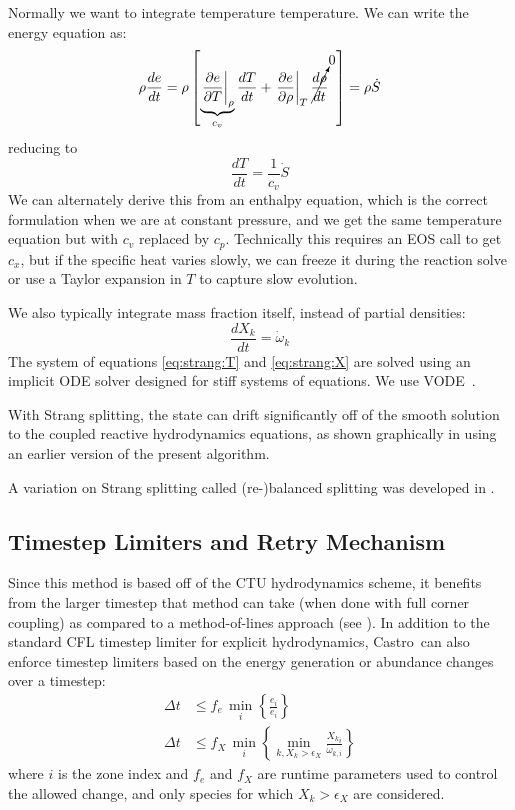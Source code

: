 \documentclass[times,modern]{aastex63}
\newcommand{\castro}{{\sf Castro}}
\newcommand{\omegadot}{\dot{\omega}}
\newcommand{\Sdot}{\dot{S}}
\newcommand{\odt}[1]{{\frac{{d#1}}{dt}}}
\begin{document}
Normally we want to integrate temperature temperature.  We can write the
energy equation as:
\begin{equation}
\rho \odt{e} = \rho \left [ \underbrace{\left . \frac{\partial e}{\partial T} \right |_\rho}_{c_v}
                            \odt{T} +
                            \left . \frac{\partial e}{\partial \rho} \right |_T
                            \cancelto{0}{\odt{\rho}} \;\; \right ] = \rho \Sdot
\end{equation}
reducing to
\begin{equation}
\label{eq:strang:T}
\odt{T} = \frac{1}{c_v} \Sdot
\end{equation}
We can alternately derive this from an enthalpy equation, which is the
correct formulation when we are at constant pressure, and we get the
same temperature equation but with $c_v$ replaced by $c_p$.
Technically this requires an EOS call to get $c_x$, but if the
specific heat varies slowly, we can freeze it during the reaction
solve or use a Taylor expansion in $T$ to capture slow evolution.

We also typically integrate mass fraction itself, instead of partial
densities:
\begin{equation}
\label{eq:strang:X}
\odt{X_k} = \omegadot_k
\end{equation}
The system of equations \ref{eq:strang:T} and \ref{eq:strang:X} are
solved using an implicit ODE solver designed for stiff systems of
equations.  We use VODE~\citep{vode}.

With Strang splitting, the state can drift significantly off of the
smooth solution to the coupled reactive hydrodynamics equations, as
shown graphically in \cite{astronum:2018} using an earlier version of
the present algorithm.

A variation on Strang splitting called (re-)balanced splitting was
developed in \citet{speth:2013}.


\subsection{Timestep Limiters and Retry Mechanism}

Since this method is based off of the CTU hydrodynamics scheme, it
benefits from the larger timestep that method can take (when done with
full corner coupling) as compared to a method-of-lines approach (see
\citealt{ppmunsplit}).  In addition to the standard CFL timestep
limiter for explicit hydrodynamics, \castro\ can also enforce
timestep limiters based on the energy generation or abundance changes
over a timestep:
\begin{align}
\label{eq:dt:nuce}
\Delta t &\le f_e\, \min_{i} \left\{\frac{e_{i}}{\dot{e}_{i}}\right\} \\
%
\label{eq:dt:nucX}
\Delta t &\le f_X\, \min_{i} \left\{\min_{k,X_k > \epsilon_X}\frac{{X_k}_{i}}{{\omegadot_{k,i}}}\right\}
\end{align}
where $i$ is the zone index and $f_e$ and $f_X$ are runtime parameters
used to control the allowed change, and only species for which $X_k > \epsilon_X$ are considered.
\end{document}
